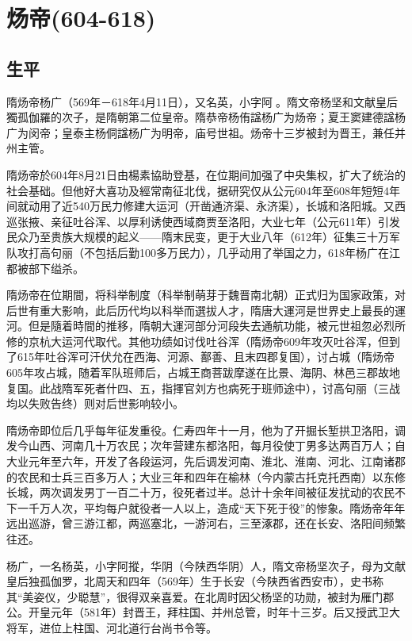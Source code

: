 
\section{炀帝\tiny(604-618)}

\subsection{生平}

隋炀帝杨广（569年－618年4月11日），又名英，小字阿𡡉。隋文帝杨坚和文献皇后獨孤伽羅的次子，是隋朝第二位皇帝。隋恭帝杨侑諡杨广为炀帝；夏王窦建德諡杨广为闵帝；皇泰主杨侗諡杨广为明帝，庙号世祖。炀帝十三岁被封为晋王，兼任并州主管。

隋炀帝於604年8月21日由楊素協助登基，在位期间加强了中央集权，扩大了统治的社会基础。但他好大喜功及經常南征北伐，据研究仅从公元604年至608年短短4年间就动用了近540万民力修建大运河（开凿通济渠、永济渠），长城和洛阳城。又西巡张掖、亲征吐谷浑、以厚利诱使西域商贾至洛阳，大业七年（公元611年）引发民众乃至贵族大规模的起义——隋末民变，更于大业八年（612年）征集三十万军队攻打高句丽（不包括后勤100多万民力），几乎动用了举国之力，618年杨广在江都被部下缢杀。

隋炀帝在位期間，将科举制度（科举制萌芽于魏晋南北朝）正式归为国家政策，对后世有重大影响，此后历代均以科举而選拔人才，隋唐大運河是世界史上最長的運河。但是隨着時間的推移，隋朝大運河部分河段失去通航功能，被元世祖忽必烈所修的京杭大运河代取代。其他功绩如讨伐吐谷浑（隋炀帝609年攻灭吐谷浑，但到了615年吐谷浑可汗伏允在西海、河源、鄯善、且末四郡复国），讨占城（隋炀帝605年攻占城，随着军队班师后，占城王商菩跋摩遂在比景、海阴、林邑三郡故地复国。此战隋军死者什四、五，指揮官刘方也病死于班师途中），讨高句丽（三战均以失败告终）则对后世影响较小。

隋炀帝即位后几乎每年征发重役。仁寿四年十一月，他为了开掘长堑拱卫洛阳，调发今山西、河南几十万农民；次年营建东都洛阳，每月役使丁男多达两百万人；自大业元年至六年，开发了各段运河，先后调发河南、淮北、淮南、河北、江南诸郡的农民和士兵三百多万人；大业三年和四年在榆林（今内蒙古托克托西南）以东修长城，两次调发男丁一百二十万，役死者过半。总计十余年间被征发扰动的农民不下一千万人次，平均每户就役者一人以上，造成“天下死于役”的惨象。隋炀帝年年远出巡游，曾三游江都，两巡塞北，一游河右，三至涿郡，还在长安、洛阳间频繁往还。

杨广，一名杨英，小字阿摐，华阴（今陕西华阴）人，隋文帝杨坚次子，母为文献皇后独孤伽罗，北周天和四年（569年）生于长安（今陕西省西安市），史书称其“美姿仪，少聪慧”，很得双亲喜爱。在北周时因父杨坚的功勋，被封为雁门郡公。开皇元年（581年）封晋王，拜柱国、并州总管，时年十三岁。后又授武卫大将军，进位上柱国、河北道行台尚书令等。

